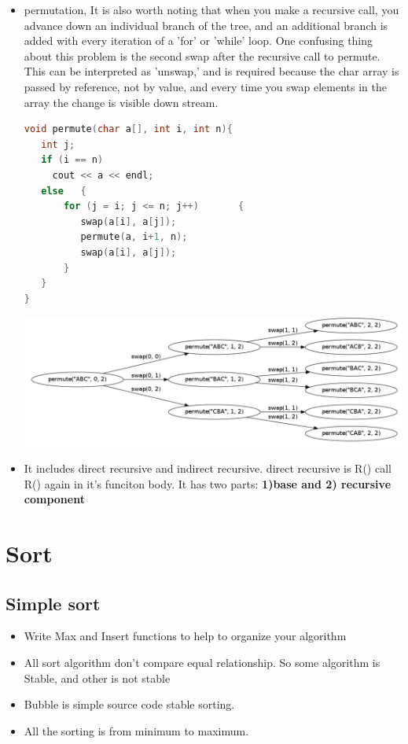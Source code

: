 \documentclass[a4paper,12pt,twoside]{book}
\begin{document}
\begin{itemize}
\begin{enumerate}
\end{enumerate}

\item permutation, It is also worth noting that when you make a recursive call, you advance down an individual branch of the tree, and an additional branch is added with every iteration of a 'for' or 'while' loop. One confusing thing about this problem is the second swap after the recursive call to permute. This can be interpreted as 'unswap,' and is required because the char array is passed by reference, not by value, and every time you swap elements in the array the change is visible down stream.

\begin{lstlisting}[frame=single, language=c++]
void permute(char a[], int i, int n){
   int j;
   if (i == n)
     cout << a << endl;
   else   {
       for (j = i; j <= n; j++)       {
          swap(a[i], a[j]);          
          permute(a, i+1, n);
          swap(a[i], a[j]);
       }
   }
} 
\end{lstlisting}

\includegraphics[scale=0.25]{pics/permutation.png}

\item It includes direct recursive and indirect recursive. direct recursive is R() call R() again in it's funciton body. It has two parts: \textbf{1)base and 2) recursive component}




\end{itemize}

\section{Sort}
\subsection{Simple sort}
\begin{itemize}
\item Write Max and Insert functions to help to organize your algorithm
\item All sort algorithm don't compare equal relationship. So some algorithm is Stable, and other is not stable
\item Bubble is simple source code stable sorting. 
\item All the sorting is from minimum to maximum.
\end{itemize}
 
\end{document}
